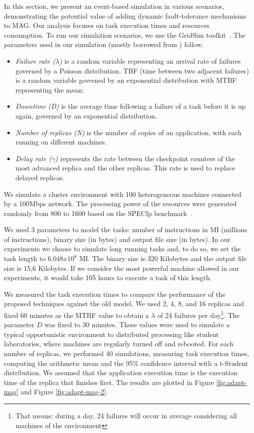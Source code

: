 \documentclass{cpeauth}
\begin{document}
In this section, we present an event-based simulation in various scenarios,
demonstrating the potential value of adding dynamic fault-tolerance mechanisms
to MAG. Our analysis focuses on task execution times and resources consumption.
To run our simulation scenarios, we use the GridSim toolkit~\cite{buyya02}. The
parameters used in our simulation (mostly borrowed from \cite{plank98,
beguelin97}) follow. 

\begin{itemize}
    \item \emph{Failure rate ($\lambda$)} is a random variable
representing an arrival rate of failures governed by a Poisson distribution.
TBF (time between two adjacent failures) is a random variable governed by an
exponential distribution with MTBF representing the mean;
    
    \item \emph{Downtime (D)} is the average time following a failure of a
task before it is up again, governed by an exponential distribution.
   
    \item \emph{Number of replicas (N)} is the number of copies of an
application, with each running on different machines.  

    \item \emph{Delay rate ($\gamma$)} represents the rate between the checkpoint
counters of the most advanced replica and the other replicas. This rate is used
to replace delayed replicas. 
\end{itemize}

We simulate a cluster environment with 100 heterogeneous machines connected by
a 100Mbps network. The processing power of the resources were generated
randomly from 800 to 1600 based on the SPECfp benchmark~\cite{spec06}.

We used 3 parameters to model the tasks: number of instructions in MI (millions
of instructions), binary size (in bytes) and output file size (in bytes). In
our experiments we choose to simulate long running tasks and, to do so, we set
the task length to $6.048 x 10^8$ MI. The binary size is 320 Kilobytes and the
output file size is 15,6 Kilobytes. If we consider the most powerful machine
allowed in our experiments, it would take 105 hours to execute a task of this
length.

We measured the task execution times to compare the performance of the proposed
techniques against the old model. We used 2, 4, 8, and 16 replicas and fixed 60
minutes as the MTBF value to obtain a $\lambda$ of 24 failures per
day\footnote{That means: during a day, 24 failures will occur in average considering all
machines of the environment}. The parameter $D$ was fixed to 30 minutes.
These values were used to simulate a typical opportunistic environment to
distributed processing like student laboratories, where machines are regularly
turned off and rebooted. For each number of replicas, we performed 40 simulations,
measuring task execution times, computing the arithmetic mean and
the 95\% confidence interval with a t-Student distribution. We assumed that the
application execution time is the execution time of the replica that finishes
first. The results are plotted in Figure \ref{fig:adapt-mag} and Figure
\ref{fig:adapt-mag-2}.
\end{document}
